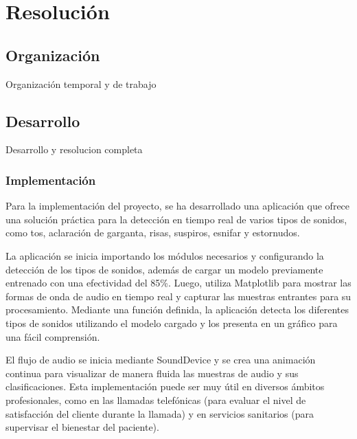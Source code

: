 
\section{Resolución}
\subsection{Organización}
Organización temporal y de trabajo

\subsection{Desarrollo}
Desarrollo y resolucion completa
\subsubsection{Implementación}
Para la implementación del proyecto, se ha desarrollado una aplicación que ofrece una solución práctica para la detección en tiempo real de varios tipos de sonidos, como tos, aclaración de garganta, risas, suspiros, esnifar y estornudos.

La aplicación se inicia importando los módulos necesarios y configurando la detección de los tipos de sonidos, además de cargar un modelo previamente entrenado con una efectividad del 85\%. Luego, utiliza Matplotlib para mostrar las formas de onda de audio en tiempo real y capturar las muestras entrantes para su procesamiento. Mediante una función definida, la aplicación detecta los diferentes tipos de sonidos utilizando el modelo cargado y los presenta en un gráfico para una fácil comprensión.

El flujo de audio se inicia mediante SoundDevice y se crea una animación continua para visualizar de manera fluida las muestras de audio y sus clasificaciones. Esta implementación puede ser muy útil en diversos ámbitos profesionales, como en las llamadas telefónicas (para evaluar el nivel de satisfacción del cliente durante la llamada) y en servicios sanitarios (para supervisar el bienestar del paciente).